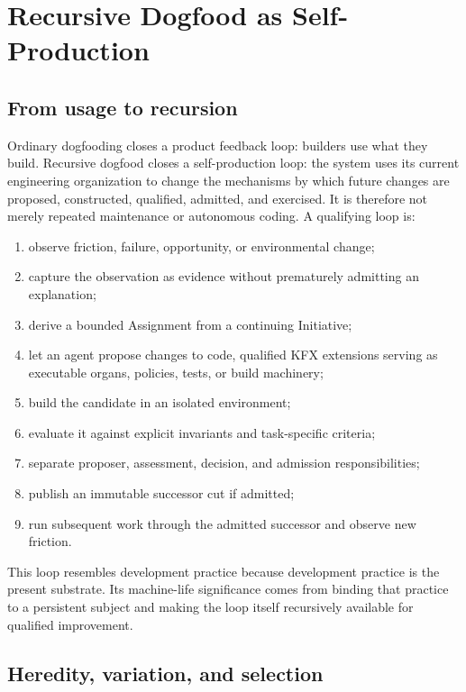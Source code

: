 \section{Recursive Dogfood as Self-Production}

\subsection{From usage to recursion}

Ordinary dogfooding closes a product feedback loop: builders use what they
build. Recursive dogfood closes a self-production loop: the system uses its
current engineering organization to change the mechanisms by which future
changes are proposed, constructed, qualified, admitted, and exercised. It is
therefore not merely repeated maintenance or autonomous coding. A qualifying
loop is:

\begin{enumerate}[leftmargin=*]
  \item observe friction, failure, opportunity, or environmental change;
  \item capture the observation as evidence without prematurely admitting an
  explanation;
  \item derive a bounded Assignment from a continuing Initiative;
  \item let an agent propose changes to code, qualified KFX extensions serving
  as executable organs, policies, tests, or build machinery;
  \item build the candidate in an isolated environment;
  \item evaluate it against explicit invariants and task-specific criteria;
  \item separate proposer, assessment, decision, and admission responsibilities;
  \item publish an immutable successor cut if admitted;
  \item run subsequent work through the admitted successor and observe new
  friction.
\end{enumerate}

This loop resembles development practice because development practice is the
present substrate. Its machine-life significance comes from binding that
practice to a persistent subject and making the loop itself recursively
available for qualified improvement.

\subsection{Heredity, variation, and selection}

